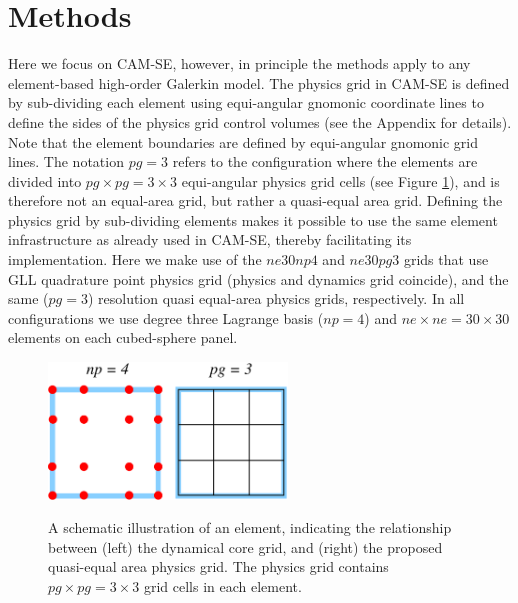 \documentclass[twocol]{ametsoc}
\begin{document}
\section{Methods}\label{sec:methods}
Here we focus on CAM-SE, however, in principle the methods apply to any element-based high-order Galerkin model. The physics grid in CAM-SE is defined by sub-dividing each element using equi-angular gnomonic coordinate lines to define the sides of the physics grid control volumes (see the Appendix for details). Note that the element boundaries are defined by equi-angular gnomonic grid lines. The notation $pg=3$ refers to the configuration where the elements are divided into $pg\times pg=3\times 3$ equi-angular physics grid cells (see Figure \ref{fig:np4_pg3}){\color{red}, and is therefore not an equal-area grid, but rather a quasi-equal area grid.{}} Defining the physics grid by sub-dividing elements makes it possible to use the same element infrastructure as already used in CAM-SE, thereby facilitating its implementation. Here we make use of the $ne30np4$ and $ne30pg3$ grids that use GLL quadrature point physics grid (physics and dynamics grid coincide), and the same ($pg=3$) resolution quasi equal-area physics grids, respectively. In all configurations we use degree three Lagrange basis ($np=4$) and $ne\times ne=30\times 30$ elements on each cubed-sphere panel.

\begin{figure}[t]
\noindent\includegraphics[width=15pc,angle=0]{figs/np4_pg3.pdf}\\
\caption{A schematic illustration of an element, indicating the relationship between (left) the dynamical core grid, and (right) the proposed quasi-equal area physics grid. The physics grid contains $pg\times pg=3\times 3$ grid cells in each element.}
\label{fig:np4_pg3}
\end{figure}
\end{document}
